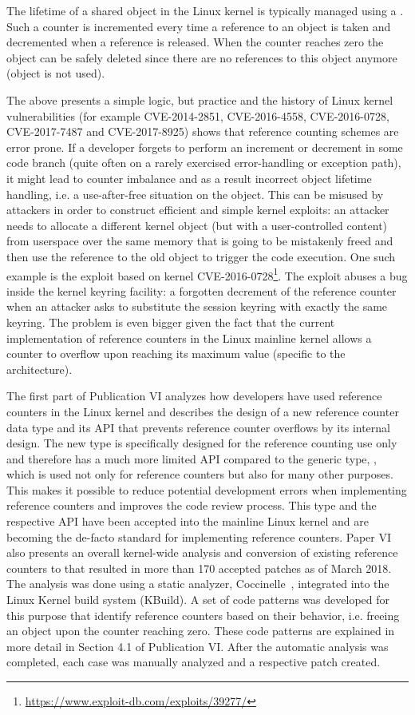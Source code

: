 The lifetime of a shared object in the Linux kernel is typically managed using a . 
Such a counter is incremented every time a reference to an object is taken and decremented when a reference is released. 
When the counter reaches zero the object can be safely deleted since there are no references to this object anymore (object is not used).

The above presents a simple logic, but practice and the history of Linux kernel vulnerabilities (for example CVE-2014-2851, CVE-2016-4558, CVE-2016-0728, CVE-2017-7487 and CVE-2017-8925) shows that reference counting schemes are error prone. If a developer forgets to perform an increment or decrement in some code branch (quite often on a rarely exercised error-handling or exception path), it might lead to counter imbalance and as a result incorrect object lifetime handling, i.e. a use-after-free situation on the object. This can be misused by attackers in order to construct efficient and simple kernel exploits: an attacker needs to allocate a different kernel object (but with a user-controlled content) from userspace over the same memory that is going to be mistakenly freed and then use the reference to the old object to trigger the code execution. One such example is the exploit based on kernel CVE-2016-0728\footnote{\url{https://www.exploit-db.com/exploits/39277/}}. The exploit abuses a bug inside the kernel keyring facility: a forgotten decrement of the reference counter when an attacker asks to substitute the session keyring with exactly the same keyring. 
The problem is even bigger given the fact that the current implementation of reference counters in the Linux mainline kernel allows a counter to overflow upon reaching its maximum value (specific to the architecture). 

The first part of Publication VI analyzes how developers have used reference counters in the Linux kernel and describes the design of a new reference counter data type  and its API that prevents reference counter overflows by its internal design. 
The new type is specifically designed for the reference counting use only and therefore has a much more limited API compared to the generic type, , which is used not only for reference counters but also for many other purposes. This makes it possible to reduce potential development errors when implementing reference counters and improves the code review process.   
This type and the respective API have been accepted into the mainline Linux kernel and are becoming the de-facto standard for implementing reference counters. 
Paper VI also presents an overall kernel-wide analysis and conversion of existing reference counters to  that resulted in more than 170 accepted patches as of March 2018. The analysis was done using a static analyzer, Coccinelle~\cite{coccinelle}, integrated into the Linux Kernel build system (KBuild). A set of code patterns was developed for this purpose that identify reference counters based on their behavior, i.e. freeing an object upon the counter reaching zero. These code patterns are explained in more detail in Section 4.1 of Publication VI. After the automatic analysis was completed, each case was manually analyzed and a respective patch created. 


